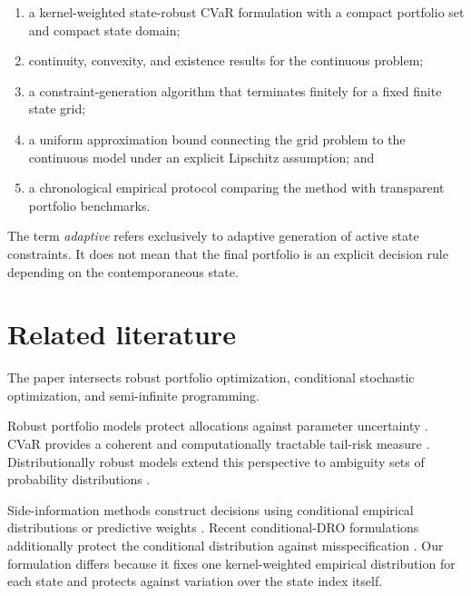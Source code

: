 \documentclass[11pt,a4paper]{article}
\theoremstyle{definition}
\theoremstyle{remark}
\begin{document}
\begin{enumerate}[label=(\roman*)]
    \item a kernel-weighted state-robust CVaR formulation with a compact
    portfolio set and compact state domain;

    \item continuity, convexity, and existence results for the continuous
    problem;

    \item a constraint-generation algorithm that terminates finitely for a
    fixed finite state grid;

    \item a uniform approximation bound connecting the grid problem to the
    continuous model under an explicit Lipschitz assumption; and

    \item a chronological empirical protocol comparing the method with
    transparent portfolio benchmarks.
\end{enumerate}

The term \emph{adaptive} refers exclusively to adaptive generation of active
state constraints. It does not mean that the final portfolio is an explicit
decision rule depending on the contemporaneous state.

\section{Related literature}

The paper intersects robust portfolio optimization, conditional stochastic
optimization, and semi-infinite programming.

Robust portfolio models protect allocations against parameter uncertainty
\citep{goldfarb2003robust,fabozzi2007robust}. CVaR provides a coherent and
computationally tractable tail-risk measure
\citep{rockafellar2000optimization,rockafellar2002conditional}.
Distributionally robust models extend this perspective to ambiguity sets of
probability distributions
\citep{delage2010distributionally,esfahani2018data}.

Side-information methods construct decisions using conditional empirical
distributions or predictive weights
\citep{bertsimas2020predictive,scaillet2004nonparametric}.
Recent conditional-DRO formulations additionally protect the conditional
distribution against misspecification
\citep{esteban2022distributionally,nguyen2025robustifying}.
Our formulation differs because it fixes one kernel-weighted empirical
distribution for each state and protects against variation over the state
index itself.
\end{document}
